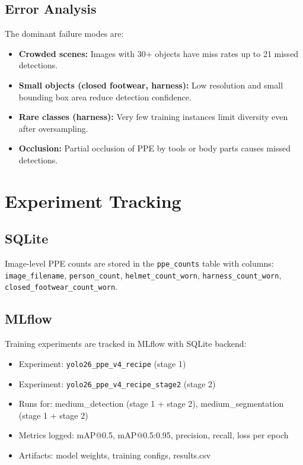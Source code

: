 \documentclass[a4paper,11pt]{article}
\begin{document}
\subsection{Error Analysis}

The dominant failure modes are:
\begin{itemize}[leftmargin=2cm, itemsep=2pt]
  \item \textbf{Crowded scenes:} Images with 30+ objects have miss rates up to 21 missed detections.
  \item \textbf{Small objects (closed footwear, harness):} Low resolution and small bounding box area reduce detection confidence.
  \item \textbf{Rare classes (harness):} Very few training instances limit diversity even after oversampling.
  \item \textbf{Occlusion:} Partial occlusion of PPE by tools or body parts causes missed detections.
\end{itemize}

\section{Experiment Tracking}

\subsection{SQLite}

Image-level PPE counts are stored in the \texttt{ppe\_counts} table with columns:
\texttt{image\_filename}, \texttt{person\_count}, \texttt{helmet\_count\_worn}, \texttt{harness\_count\_worn}, \texttt{closed\_footwear\_count\_worn}.

\subsection{MLflow}

Training experiments are tracked in MLflow with SQLite backend:
\begin{itemize}[leftmargin=2cm, itemsep=2pt]
  \item Experiment: \texttt{yolo26\_ppe\_v4\_recipe} (stage 1)
  \item Experiment: \texttt{yolo26\_ppe\_v4\_recipe\_stage2} (stage 2)
  \item Runs for: medium\_detection (stage 1 + stage 2), medium\_segmentation (stage 1 + stage 2)
  \item Metrics logged: mAP@0.5, mAP@0.5:0.95, precision, recall, loss per epoch
  \item Artifacts: model weights, training configs, results.csv
\end{itemize}
\end{document}
